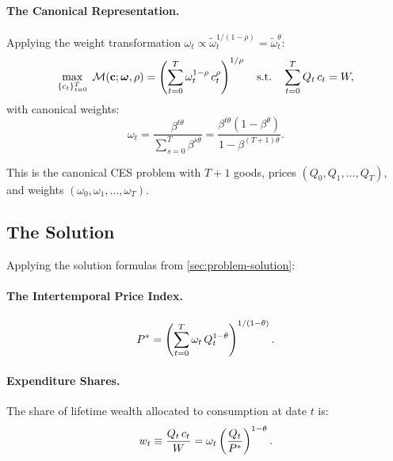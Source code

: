 \paragraph{The Canonical Representation.}
Applying the weight transformation $\omega_t \propto \tilde{\omega}_t^{1/(1-\rho)} = \tilde{\omega}_t^{\theta}$:
\begin{equation}
\max_{\{c_t\}_{t=0}^{T}} \; \mathcal{M}(\mathbf{c}; \boldsymbol{\omega}, \rho) = \left( \sum_{t=0}^{T} \omega_t^{1-\rho} \, c_t^{\rho} \right)^{1/\rho} \quad \text{s.t.} \quad \sum_{t=0}^{T} Q_t \, c_t = W,
\label{eq:canonical-T}
\end{equation}
with canonical weights:
\begin{equation}
\omega_t = \frac{\beta^{t\theta}}{\sum_{s=0}^{T} \beta^{s\theta}} = \frac{\beta^{t\theta} (1-\beta^{\theta})}{1 - \beta^{(T+1)\theta}}.
\label{eq:canonical-weights-T}
\end{equation}

This is the canonical CES problem with $T+1$ goods, prices $(Q_0, Q_1, \ldots, Q_T)$, and weights $(\omega_0, \omega_1, \ldots, \omega_T)$.

\subsection{The Solution}
\label{subsec:T-solution}

Applying the solution formulas from \cref{sec:problem-solution}:

\paragraph{The Intertemporal Price Index.}
\begin{equation}
P^{*} = \left( \sum_{t=0}^{T} \omega_t \, Q_t^{1-\theta} \right)^{1/(1-\theta)}.
\label{eq:price-index-T}
\end{equation}

\paragraph{Expenditure Shares.}
The share of lifetime wealth allocated to consumption at date $t$ is:
\begin{equation}
w_t \equiv \frac{Q_t \, c_t}{W} = \omega_t \left( \frac{Q_t}{P^{*}} \right)^{1-\theta}.
\label{eq:shares-T}
\end{equation}

